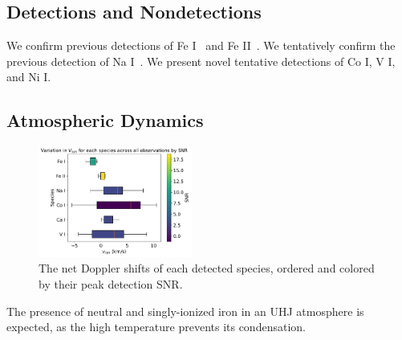 \documentclass[twocolumn]{aastex631}
\begin{document}
        \subsection{Detections and Nondetections}\label{subsec:Detections}
            We confirm previous detections of Fe I~\citep{Nugroho2020} and Fe II~\citep{CasasayasBarris2020, Nugroho2020, BelloArufe2022}. We tentatively confirm the previous detection of Na I~\citep{CasasayasBarris2020, Nugroho2020, Sicilia2022}. We present novel tentative detections of Co I, V I, and Ni I.

        
        \subsection{Atmospheric Dynamics}\label{subsec:Atmospheric Dynamics}
            

        \begin{figure}[]\label{fig:combined-species-snr} 
            \includegraphics[width=0.45\textwidth]{plots/combined-species-snr/KELT-20b.inverted-transmission-better.CombinedSpeciesSNRs.pdf}
            \caption{The net Doppler shifts of each detected species, ordered and colored by their peak detection SNR.}
            
        \end{figure}

            The presence of neutral and singly-ionized iron in an UHJ atmosphere is expected, as the high temperature prevents its condensation.
        
\end{document}
